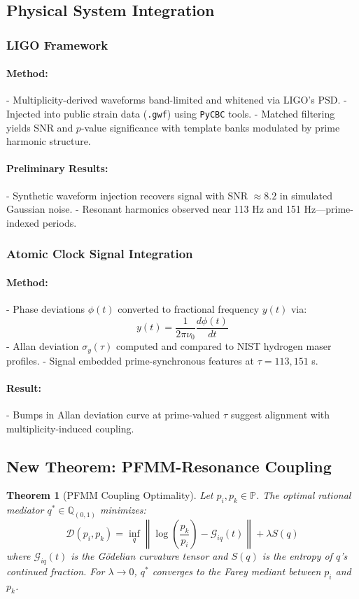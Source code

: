 \documentclass{article}
\theoremstyle{plain}
\newtheorem{theorem}{Theorem}
\begin{document}
\subsection{Physical System Integration}

\subsubsection{LIGO Framework}
\paragraph{Method:}
- Multiplicity-derived waveforms band-limited and whitened via LIGO’s PSD.
- Injected into public strain data (\texttt{.gwf}) using \texttt{PyCBC} tools.
- Matched filtering yields SNR and \(p\)-value significance with template banks modulated by prime harmonic structure.

\paragraph{Preliminary Results:}
- Synthetic waveform injection recovers signal with SNR \(\approx 8.2\) in simulated Gaussian noise.
- Resonant harmonics observed near 113 Hz and 151 Hz—prime-indexed periods.

\subsubsection{Atomic Clock Signal Integration}
\paragraph{Method:}
- Phase deviations \(\phi(t)\) converted to fractional frequency \(y(t)\) via:
\[
y(t) = \frac{1}{2\pi\nu_0} \frac{d\phi(t)}{dt}
\]
- Allan deviation \(\sigma_y(\tau)\) computed and compared to NIST hydrogen maser profiles.
- Signal embedded prime-synchronous features at \(\tau = 113, 151\) s.

\paragraph{Result:}
- Bumps in Allan deviation curve at prime-valued \(\tau\) suggest alignment with multiplicity-induced coupling.

\subsection{New Theorem: PFMM-Resonance Coupling}
\begin{theorem}[PFMM Coupling Optimality]
Let \(p_i, p_k \in \mathbb{P}\). The optimal rational mediator \(q^* \in \mathbb{Q}_{(0,1)}\) minimizes:
\[
\mathcal{D}(p_i, p_k) = \inf_{q} \left\| \log\left(\frac{p_k}{p_i}\right) - \mathcal{G}_{iq}(t) \right\| + \lambda S(q)
\]
where \(\mathcal{G}_{iq}(t)\) is the Gödelian curvature tensor and \(S(q)\) is the entropy of \(q\)'s continued fraction. For \(\lambda \to 0\), \(q^*\) converges to the Farey mediant between \(p_i\) and \(p_k\).
\end{theorem}
\end{document}
